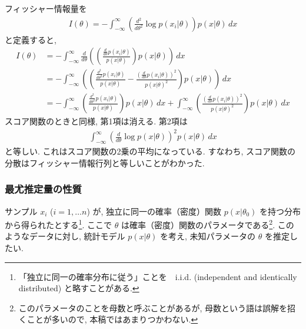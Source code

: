 \documentclass[a4paper, 12pt]{jarticle}
\begin{document}
フィッシャー情報量を
\begin{align}
I(\theta)=-\int^{\infty}_{-\infty}\left(\frac{d^2}{d \theta^2} \log p(x_i | \theta)\right) p(x|\theta) \, dx
\end{align}
と定義すると, 
\begin{align}
I(\theta)&=-\int^{\infty}_{-\infty}\frac{d}{d \theta} \left(\left(\frac{\frac{d}{d\theta} p(x_i | \theta)}{p(x|\theta)}\right) p(x|\theta) \right) \, dx \\
&=-\int^{\infty}_{-\infty}\left(\left(\frac{\frac{d^2}{d\theta^2} p(x_i | \theta)}{p(x|\theta)} - \frac{ ( \frac{d}{d\theta} p(x_i | \theta))^2}{p(x|\theta)^2 }\right) p(x|\theta) \right) \, dx \\
&=-\int^{\infty}_{-\infty}\left(\frac{\frac{d^2}{d\theta^2} p(x_i | \theta)}{p(x|\theta)}\right) p(x|\theta) \, dx +\int^{\infty}_{-\infty}\left( \frac{ ( \frac{d}{d\theta} p(x_i | \theta))^2}{p(x|\theta)^2 }\right) p(x|\theta) \, dx
\end{align}
スコア関数のときと同様, 第1項は消える. 
第2項は
\begin{align}
\int^{\infty}_{-\infty}\left(\frac{d}{d\theta} \log p(x | \theta)\right)^2 p(x|\theta) \, dx 
\end{align}
と等しい. これはスコア関数の2乗の平均になっている. 
すなわち, スコア関数の分散はフィッシャー情報行列と等しいことがわかった. 

\subsubsection{最尤推定量の性質}
\label{secPropertyMLE}
サンプル $x_i$ ($i=1,\ldots n$) が, 独立に同一の確率（密度）関数 $p(x|\theta_0)$ を持つ分布から得られたとする\footnote{ 「独立に同一の確率分布に従う」ことを　i.i.d. (independent and identically distributed) と略すことがある.}. ここで $\theta$ は確率（密度）関数のパラメータである\footnote{このパラメータのことを母数と呼ぶことがあるが, 母数という語は誤解を招くことが多いので, 本稿ではあまりつかわない.}.  
このようなデータに対し, 統計モデル $p(x|\theta)$ を考え, 未知パラメータの $\theta$ を推定したい.
\end{document}
